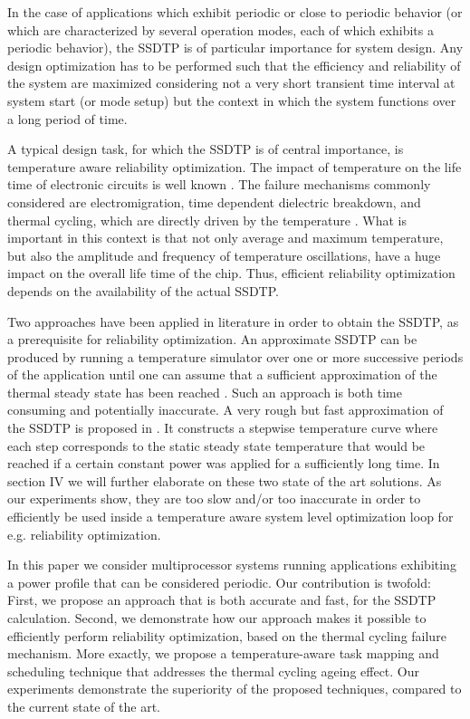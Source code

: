 In the case of applications which exhibit periodic or close to periodic behavior (or which are characterized by several operation modes, each of which exhibits a periodic behavior), the SSDTP is of particular importance for system design. Any design optimization has to be performed such that the efficiency and reliability of the system are maximized considering not a very short transient time interval at system start (or mode setup) but the context in which the system functions over a long period of time.

A typical design task, for which the SSDTP is of central importance, is temperature aware reliability optimization. The impact of temperature on the life time of electronic circuits is well known \cite{lu2004, srinivasan2004, jedec2010, hieu2004, xiang2010, coskun2006}. The failure mechanisms commonly considered are electromigration, time dependent dielectric breakdown, and thermal cycling, which are directly driven by the temperature \cite{jedec2010}. What is important in this context is that not only average and maximum temperature, but also the amplitude and frequency of temperature oscillations, have a huge impact on the overall life time of the chip. Thus, efficient reliability optimization depends on the availability of the actual SSDTP.

Two approaches have been applied in literature in order to obtain the SSDTP, as a prerequisite for reliability optimization. An approximate SSDTP can be produced by running a temperature simulator over one or more successive periods of the application until one can assume that a sufficient approximation of the thermal steady state has been reached \cite{srinivasan2004}. Such an approach is both time consuming and potentially inaccurate. A very rough but fast approximation of the SSDTP is proposed in \cite{huang2009}. It constructs a stepwise temperature curve where each step corresponds to the static steady state temperature that would be reached if a certain constant power was applied for a sufficiently long time.  In section IV we will further elaborate on these two state of the art solutions. As our experiments show, they are too slow and/or too inaccurate in order to efficiently be used inside a temperature aware system level optimization loop for e.g. reliability optimization.

In this paper we consider multiprocessor systems running applications exhibiting a power profile that can be considered periodic. Our contribution is twofold: First, we propose an approach that is both accurate and fast, for the SSDTP calculation. Second, we demonstrate how our approach makes it possible to efficiently perform reliability optimization, based on the thermal cycling failure mechanism. More exactly, we propose a temperature-aware task mapping and scheduling technique that addresses the thermal cycling ageing effect. Our experiments demonstrate the superiority of the proposed techniques, compared to the current state of the art.

